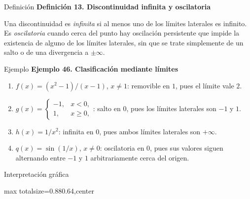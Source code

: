 \documentclass[12pt,aspectratio=169]{beamer}
\begin{document}
\begin{frame}[t,allowframebreaks]{Definición}
{\color{azul}\bfseries Definición 13. Discontinuidad infinita y oscilatoria}\par\medskip

Una discontinuidad es \emph{infinita} si al menos uno de los límites laterales es infinito. Es \emph{oscilatoria} cuando cerca del punto hay oscilación persistente que impide la existencia de alguno de los límites laterales, sin que se trate simplemente de un salto o de una divergencia a $\pm\infty$.
\end{frame}


\begin{frame}[t,allowframebreaks]{Ejemplo}
{\color{azul}\bfseries Ejemplo 46. Clasificación mediante límites}\par\medskip

\begin{enumerate}
\item $f(x)=(x^2-1)/(x-1)$, $x\ne1$: removible en $1$, pues el límite vale $2$.
\item $g(x)=\begin{cases}-1,&x<0,\\1,&x\ge0,\end{cases}$: salto en $0$, pues los límites laterales son $-1$ y $1$.
\item $h(x)=1/x^2$: infinita en $0$, pues ambos límites laterales son $+\infty$.
\item $q(x)=\sin(1/x)$, $x\ne0$: oscilatoria en $0$, pues sus valores siguen alternando entre $-1$ y $1$ arbitrariamente cerca del origen.
\end{enumerate}
\end{frame}


\begin{frame}[t,allowframebreaks]{Interpretación gráfica}
\begin{center}
\begin{adjustbox}{max totalsize={0.88\linewidth}{0.64\textheight},center}\end{adjustbox}
\end{center}
\end{frame}
\end{document}
